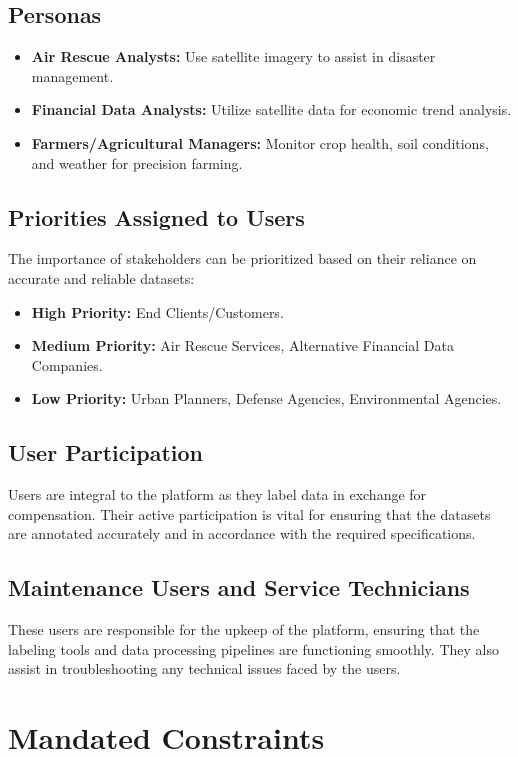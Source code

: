 \documentclass[12pt]{article}
\begin{document}
\subsection{Personas}
\begin{itemize}[leftmargin=2cm]
    \item \textbf{Air Rescue Analysts:} Use satellite imagery to assist in disaster management.
    \item \textbf{Financial Data Analysts:} Utilize satellite data for economic trend analysis.
    \item \textbf{Farmers/Agricultural Managers:} Monitor crop health, soil conditions, and weather for precision farming.
\end{itemize}

\subsection{Priorities Assigned to Users}
The importance of stakeholders can be prioritized based on their reliance on accurate and reliable datasets:
\begin{itemize}[leftmargin=2cm]
    \item \textbf{High Priority:} End Clients/Customers.
    \item \textbf{Medium Priority:} Air Rescue Services, Alternative Financial Data Companies.
    \item \textbf{Low Priority:} Urban Planners, Defense Agencies, Environmental Agencies.
\end{itemize}

\subsection{User Participation}
Users are integral to the platform as they label data in exchange for compensation. Their active participation is vital for ensuring that the datasets are annotated accurately and in accordance with the required specifications.

\subsection{Maintenance Users and Service Technicians}
These users are responsible for the upkeep of the platform, ensuring that the labeling tools and data processing pipelines are functioning smoothly. They also assist in troubleshooting any technical issues faced by the users.


\section{Mandated Constraints}
\end{document}
